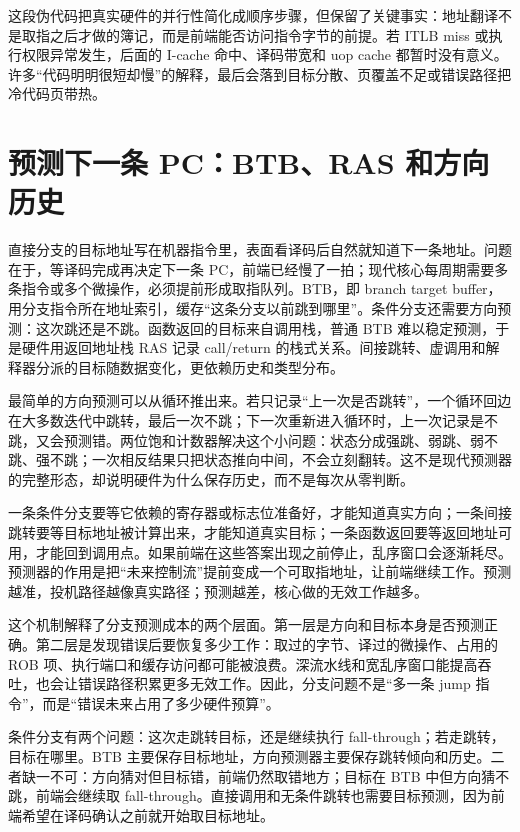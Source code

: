 这段伪代码把真实硬件的并行性简化成顺序步骤，但保留了关键事实：地址翻译不是取指之后才做的簿记，而是前端能否访问指令字节的前提。若 ITLB miss 或执行权限异常发生，后面的 I-cache 命中、译码带宽和 uop cache 都暂时没有意义。许多“代码明明很短却慢”的解释，最后会落到目标分散、页覆盖不足或错误路径把冷代码页带热。

\section{预测下一条 PC：BTB、RAS 和方向历史}

直接分支的目标地址写在机器指令里，表面看译码后自然就知道下一条地址。问题在于，等译码完成再决定下一条 PC，前端已经慢了一拍；现代核心每周期需要多条指令或多个微操作，必须提前形成取指队列。BTB，即 branch target buffer，用分支指令所在地址索引，缓存“这条分支以前跳到哪里”。条件分支还需要方向预测：这次跳还是不跳。函数返回的目标来自调用栈，普通 BTB 难以稳定预测，于是硬件用返回地址栈 RAS 记录 call/return 的栈式关系。间接跳转、虚调用和解释器分派的目标随数据变化，更依赖历史和类型分布。

最简单的方向预测可以从循环推出来。若只记录“上一次是否跳转”，一个循环回边在大多数迭代中跳转，最后一次不跳；下一次重新进入循环时，上一次记录是不跳，又会预测错。两位饱和计数器解决这个小问题：状态分成强跳、弱跳、弱不跳、强不跳；一次相反结果只把状态推向中间，不会立刻翻转。这不是现代预测器的完整形态，却说明硬件为什么保存历史，而不是每次从零判断。

一条条件分支要等它依赖的寄存器或标志位准备好，才能知道真实方向；一条间接跳转要等目标地址被计算出来，才能知道真实目标；一条函数返回要等返回地址可用，才能回到调用点。如果前端在这些答案出现之前停止，乱序窗口会逐渐耗尽。预测器的作用是把“未来控制流”提前变成一个可取指地址，让前端继续工作。预测越准，投机路径越像真实路径；预测越差，核心做的无效工作越多。

这个机制解释了分支预测成本的两个层面。第一层是方向和目标本身是否预测正确。第二层是发现错误后要恢复多少工作：取过的字节、译过的微操作、占用的 ROB 项、执行端口和缓存访问都可能被浪费。深流水线和宽乱序窗口能提高吞吐，也会让错误路径积累更多无效工作。因此，分支问题不是“多一条 jump 指令”，而是“错误未来占用了多少硬件预算”。

条件分支有两个问题：这次走跳转目标，还是继续执行 fall-through；若走跳转，目标在哪里。BTB 主要保存目标地址，方向预测器主要保存跳转倾向和历史。二者缺一不可：方向猜对但目标错，前端仍然取错地方；目标在 BTB 中但方向猜不跳，前端会继续取 fall-through。直接调用和无条件跳转也需要目标预测，因为前端希望在译码确认之前就开始取目标地址。

